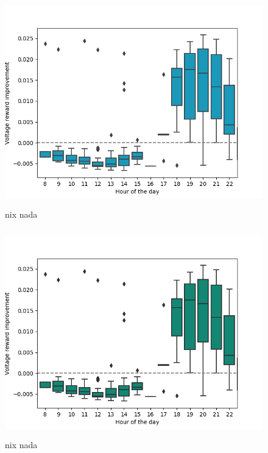 \documentclass[class=book, crop=false, 11pt]{standalone}
\begin{document}
\begin{figure}[ht]
    \center
    \includegraphics[height=9cm, width=13.5cm]{figures/config1_improvement_voltage_bluee.png}
    \caption[size = 9]{nix nada}
    \label{nixnada}
\end{figure}

\begin{figure}[ht]
    \center
    \includegraphics[height=9cm, width=13.5cm]{figures/config1_improvement_voltage.png}
    \caption[size = 9]{nix nada}
    \label{nixnada1}
\end{figure}
\end{document}
